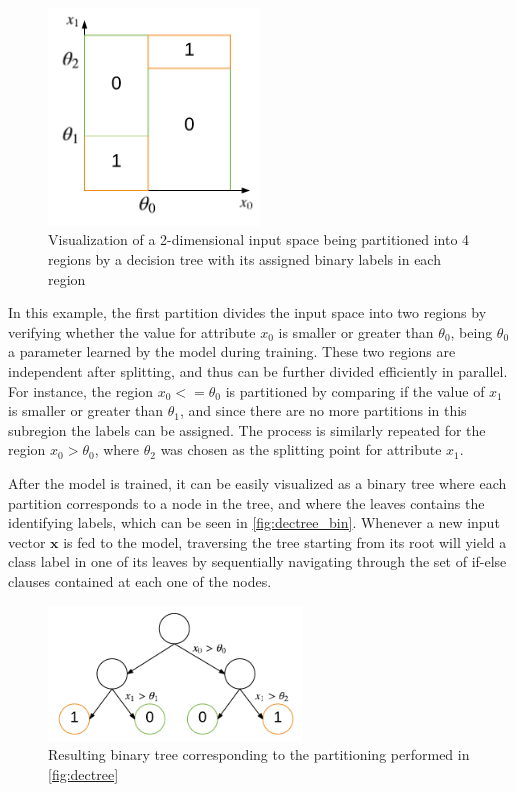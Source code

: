 \documentclass{kththesis}
\begin{document}
\begin{figure}[h]
    \centering
    \includegraphics[width=0.5\textwidth,keepaspectratio]{figures/dectree.pdf}
    \caption{Visualization of a 2-dimensional input space being partitioned into 4 regions by a decision tree with its assigned binary labels in each region}
    \label{fig:dectree}
\end{figure}

In this example, the first partition divides the input space into two regions by verifying whether the value for attribute $x_0$ is smaller or greater than $\theta_0$, being $\theta_0$ a parameter learned by the model during training. These two regions are independent after splitting, and thus can be further divided efficiently in parallel. For instance, the region $x_0 <= \theta_0$ is partitioned by comparing if the value of $x_1$ is smaller or greater than $\theta_1$, and since there are no more partitions in this subregion the labels can be assigned. The process is similarly repeated for the region  $x_0 > \theta_0$, where $\theta_2$ was chosen as the splitting point for attribute $x_1$.
 
After the model is trained, it can be easily visualized as a binary tree where each partition corresponds to a node in the tree, and where the leaves contains the identifying labels, which can be seen in \autoref{fig:dectree_bin}. Whenever a new input vector $\mathbf{x}$ is fed to the model, traversing the tree starting from its root will yield a class label in one of its leaves by sequentially navigating through the set of if-else clauses contained at each one of the nodes.  
 
\begin{figure}[h]
    \centering
    \includegraphics[width=0.6\textwidth,keepaspectratio]{figures/dectree_bin.pdf}
    \caption{Resulting binary tree corresponding to the partitioning performed in \autoref{fig:dectree}}
    \label{fig:dectree_bin}
\end{figure}
 
\end{document}
